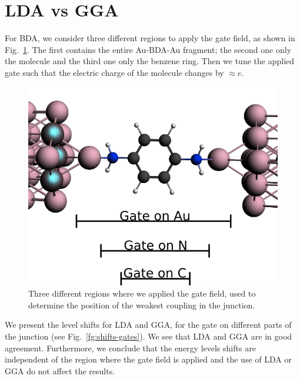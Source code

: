 \documentclass[aip,jcp,a4paper,reprint,floatfix,superscriptaddress]{revtex4-1}
\begin{document}
\section{LDA vs GGA}\label{LDA-vs-GGA}

For BDA, we consider three different regions to apply the gate field, as shown in Fig.~\ref{fg:gates-BDA}. The first contains the entire Au-BDA-Au fragment; the second one only the molecule and the third one only the benzene ring. Then we tune the applied gate such that the electric charge of the molecule changes by $\approx e$. 

\begin{figure}
\includegraphics[width=0.85\columnwidth]{img.exp/BDA-Levels/gates.png} 
\caption{Three different regions where we applied the gate field, used to determine the position of the weakest coupling in the junction.}\label{fg:gates-BDA}
\end{figure}

We present the level shifts for LDA and GGA, for the gate on different parts of the junction (see Fig.~\ref{fg:shifts-gates}). We see that LDA and GGA are in good agreement. Furthermore, we conclude that the energy levels shifts are independent of the region where the gate field is applied and the use of LDA or GGA do not affect the results. 
\end{document}
